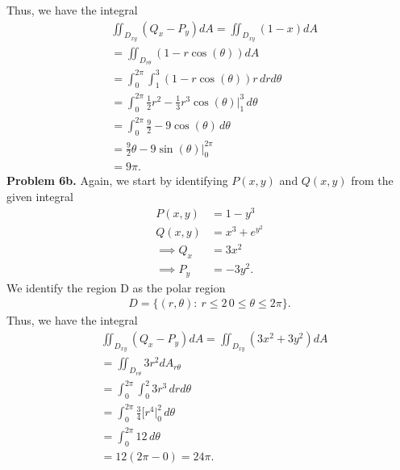\documentclass{report}
\begin{document}
    \bigbreak \noindent 
    Thus, we have the integral
    \begin{align*}
        &\iint_D_{xy} (Q_{x} - P_{y})dA = \iint_D_{xy} (1-x)dA \\
        &=\iint_{D_{r\theta }} (1-r\cos{\left(\theta \right)})dA \\
        &=\int_{0}^{2\pi }\int_{1}^{3} (1-r\cos{\left(\theta \right)})r\,drd\theta \\
        &=\int_{0}^{2\pi }\frac{1}{2}r^{2}-\frac{1}{3}r^{3}\cos{\left(\theta \right)}\bigg|_{1}^{3}  \, d\theta  \\
        &=\int_{0}^{2\pi }\frac{9}{2}-9\cos{\left(\theta \right)} \, d\theta  \\
        &=\frac{9}{2}\theta -9\sin{\left(\theta \right)}\bigg|_{0}^{2\pi} \\
        &=9\pi
    .\end{align*}
    \bigbreak \noindent 
    \textbf{Problem 6b.}
    Again, we start by identifying $P(x,y)$ and $Q(x,y)$ from the given integral
    \begin{align*}
        P(x,y) &= 1-y^{3} \\
        Q(x,y) &= x^{3} + e^{y^{2}} \\
        \implies Q_{x} &= 3x^{2} \\
        \implies P_{y} &= -3y^{2}
    .\end{align*}
    \bigbreak \noindent 
    We identify the region D as the polar region 
    \begin{align*}
        D = \{(r,\theta ):\ r \leq 2\, 0 \leq \theta  \leq 2\pi\}
    .\end{align*}
    \bigbreak \noindent 
    Thus, we have the integral
    \begin{align*}
        &\iint_{D_{xy}} (Q_{x} - P_{y})dA = \iint_{D_{xy}}(3x^{2} + 3y^{2})dA \\
        &=\iint_{D_{r\theta}}3r^{2}dA_{r\theta } \\
        &=\int_{0}^{2\pi }\int_{0}^{2}  3r^{3}\, drd\theta   \\
        &=\int_{0}^{2\pi}  \frac{3}{4}\bigg[r^{4}\bigg|_{0}^{2}\, d\theta  \\
        &=\int_{0}^{2\pi}  12\, d\theta  \\
        &=12(2\pi - 0) = 24\pi
    .\end{align*}




 
\end{document}
